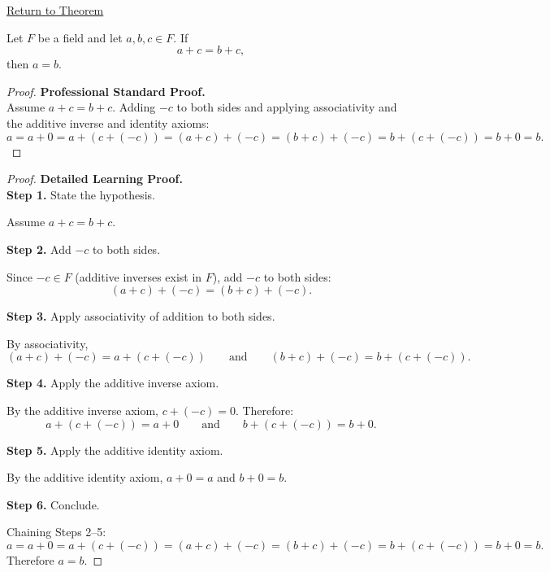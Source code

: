 \newpage
{}
\label{prf:additive-cancellation}

\begin{remark*}[Return]
\hyperref[thm:additive-cancellation]{Return to Theorem}
\end{remark*}

\begin{theorem*}
Let $F$ be a field and let $a,b,c\in F$.  If
\[
a + c = b + c,
\]
then $a = b$.
\end{theorem*}

\begin{proof}
\textbf{Professional Standard Proof.}~\\
Assume $a + c = b + c$.  Adding $-c$ to both sides and applying
associativity and the additive inverse and identity axioms:
\[
a = a + 0 = a + (c + (-c)) = (a + c) + (-c) = (b + c) + (-c) = b + (c + (-c)) = b + 0 = b.
\]
\end{proof}

\begin{proof}
\textbf{Detailed Learning Proof.}~\\

\textbf{Step 1.} State the hypothesis.

Assume $a + c = b + c$.

\textbf{Step 2.} Add $-c$ to both sides.

Since $-c\in F$ (additive inverses exist in $F$), add $-c$ to both sides:
\[
(a + c) + (-c) = (b + c) + (-c).
\]

\textbf{Step 3.} Apply associativity of addition to both sides.

By associativity,
\[
(a + c) + (-c) = a + (c + (-c))
\qquad\text{and}\qquad
(b + c) + (-c) = b + (c + (-c)).
\]

\textbf{Step 4.} Apply the additive inverse axiom.

By the additive inverse axiom, $c + (-c) = 0$.  Therefore:
\[
a + (c + (-c)) = a + 0
\qquad\text{and}\qquad
b + (c + (-c)) = b + 0.
\]

\textbf{Step 5.} Apply the additive identity axiom.

By the additive identity axiom, $a + 0 = a$ and $b + 0 = b$.

\textbf{Step 6.} Conclude.

Chaining Steps 2--5:
\[
a = a + 0 = a + (c + (-c)) = (a+c) + (-c) = (b+c) + (-c) = b + (c+(-c)) = b + 0 = b.
\]
Therefore $a = b$.
\end{proof}

